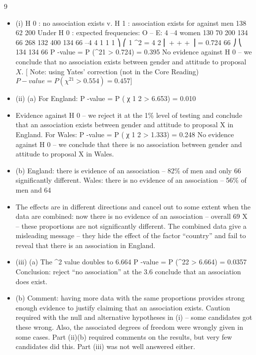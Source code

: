 \documentclass[a4paper,12pt]{article}
\begin{document}
\newpage
9
\begin{itemize}
\item (i)
H 0 : no association exists v. H 1 : association exists
for
against
men
138
62
200
Under H 0 : expected frequencies:
O – E:
4
–4
women
130
70
200
134
66
268
132
400
134
66
–4
4
1
1
1 ⎞
⎛ 1
\chi^2 = 4 2 ⎜
+
+
+
⎟ = 0.724
66 ⎠
⎝ 134 134 66
P -value = P (\chi^21 > 0.724) = 0.395
No evidence against H 0 – we conclude that no association exists between gender and attitude to proposal $X$.
[ Note: using Yates’ correction (not in the Core Reading)
$P -value = P (\chi^21 > 0.554) = 0.457]$
\item (ii)
(a)
For England:
P -value = P ( χ 1 2 > 6.653) = 0.010
\item 
Evidence against H 0 – we reject it at the 1\% level of testing and conclude that an association exists between gender and attitude to
proposal X in England.
For Wales:
P -value = P ( χ 1 2 > 1.333) = 0.248
No evidence against H 0 – we conclude that there is no association
between gender and attitude to proposal X in Wales.

\item (b)
England: there is evidence of an association – 82\% of men and only 66%
significantly different.
Wales: there is no evidence of an association – 56\% of men and 64%
\item The effects are in different directions and cancel out to some extent when the data are combined: now there is no evidence of an
association – overall 69%
X – these proportions are not significantly different.
The combined data give a misleading message – they hide the effect of the factor “country” and fail to reveal that there is an association in England.
\item (iii)
(a)
The \chi^2 value doubles to 6.664
P -value = P (\chi^22 > 6.664) = 0.0357
Conclusion: reject “no association” at the 3.6%
conclude that an association does exist.
\item (b)
Comment: having more data with the same proportions provides strong enough evidence to justify claiming that an association exists.
Caution required with the null and alternative hypotheses in (i) – some candidates got these wrong. Also, the associated degrees of freedom were wrongly given in some cases. Part (ii)(b) required comments on the results, but very few candidates did this. Part (iii) was not well answered either.
\end{itemize}
\end{document}
